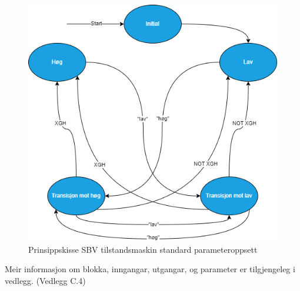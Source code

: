 \begin{figure}[htbp]
    \centering
    \includegraphics[scale=0.47]{Figurar/SBE.drawio.png}
    \caption{Prinsippskisse SBV tilstandsmaskin standard parameteroppsett}\label{fig:SBV tilstandsmaskin}
\end{figure}


Meir informasjon om blokka, inngangar, utgangar, og parameter er tilgjengeleg i vedlegg. (Vedlegg C.4)

\newpage




